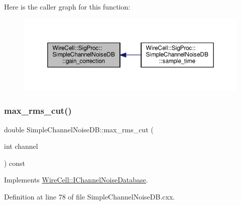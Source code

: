 Here is the caller graph for this function\+:
\nopagebreak
\begin{figure}[H]
\begin{center}
\leavevmode
\includegraphics[width=350pt]{class_wire_cell_1_1_sig_proc_1_1_simple_channel_noise_d_b_a7b4f5283401aa1668adda46ba52b06c6_icgraph}
\end{center}
\end{figure}
\mbox{\label{class_wire_cell_1_1_sig_proc_1_1_simple_channel_noise_d_b_a22eaf2783321cb45cd904f97de2ba7d3}} 
\subsubsection{\texorpdfstring{max\+\_\+rms\+\_\+cut()}{max\_rms\_cut()}}
{\footnotesize\ttfamily double Simple\+Channel\+Noise\+D\+B\+::max\+\_\+rms\+\_\+cut (\begin{DoxyParamCaption}\item[{int}]{channel }\end{DoxyParamCaption}) const\hspace{0.3cm}{\ttfamily [virtual]}}



Implements \hyperlink{class_wire_cell_1_1_i_channel_noise_database_ad5e4a49ff6b257e2ef290eeeaba95da7}{Wire\+Cell\+::\+I\+Channel\+Noise\+Database}.



Definition at line 78 of file Simple\+Channel\+Noise\+D\+B.\+cxx.

